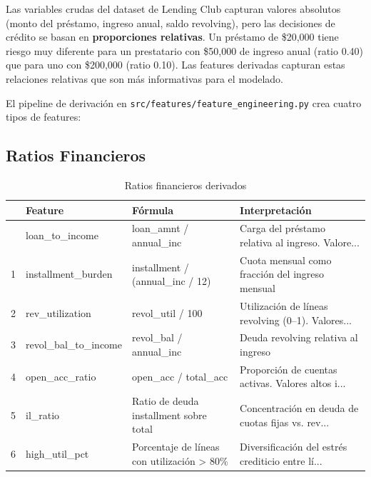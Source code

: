 \documentclass[
  spanish,
  11pt,
  letterpaper,
]{scrbook}
\theoremstyle{plain}
\theoremstyle{remark}
\begin{document}
Las variables crudas del dataset de Lending Club capturan valores
absolutos (monto del préstamo, ingreso anual, saldo revolving), pero las
decisiones de crédito se basan en \textbf{proporciones relativas}. Un
préstamo de \$20,000 tiene riesgo muy diferente para un prestatario con
\$50,000 de ingreso anual (ratio 0.40) que para uno con \$200,000 (ratio
0.10). Las features derivadas capturan estas relaciones relativas que
son más informativas para el modelado.

El pipeline de derivación en
\texttt{src/features/feature\_engineering.py} crea cuatro tipos de
features:

\subsection{Ratios Financieros}\label{ratios-financieros}

{

\begin{longtable}[]{@{}llll@{}}

\caption{\label{tbl-ratio-features}Ratios financieros derivados}

\tabularnewline

\toprule\noalign{}
& Feature & Fórmula & Interpretación \\
\midrule\noalign{}
\endhead
\bottomrule\noalign{}
\endlastfoot
0 & loan\_to\_income & loan\_amnt / annual\_inc & Carga del préstamo
relativa al ingreso. Valore... \\
1 & installment\_burden & installment / (annual\_inc / 12) & Cuota
mensual como fracción del ingreso mensual \\
2 & rev\_utilization & revol\_util / 100 & Utilización de líneas
revolving (0--1). Valores... \\
3 & revol\_bal\_to\_income & revol\_bal / annual\_inc & Deuda revolving
relativa al ingreso \\
4 & open\_acc\_ratio & open\_acc / total\_acc & Proporción de cuentas
activas. Valores altos i... \\
5 & il\_ratio & Ratio de deuda installment sobre total & Concentración
en deuda de cuotas fijas vs. rev... \\
6 & high\_util\_pct & Porcentaje de líneas con utilización
\textgreater{} 80\% & Diversificación del estrés crediticio entre
lí... \\

\end{longtable}

}
\end{document}
